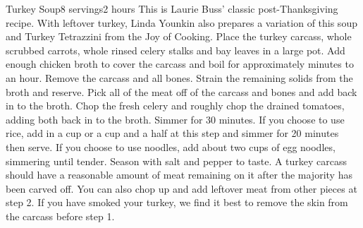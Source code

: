 \begin{recipe}{Turkey Soup}{8 servings}{2 hours}
\freeform This  is Laurie Buss' classic post-Thanksgiving recipe. With leftover turkey, Linda Younkin also prepares a variation of this soup and Turkey Tetrazzini from the Joy of Cooking.
Place the turkey carcass, whole scrubbed carrots, whole rinsed celery stalks and bay leaves in a large pot. Add enough chicken broth to cover the carcass and boil for approximately \unit[45]{minutes} to an hour.
\newstep Remove the carcass and all bones. Strain the remaining solids from the broth and reserve. Pick all of the meat off of the carcass and bones and add back in to the broth.
Chop the fresh celery and roughly chop the drained tomatoes, adding both back in to the broth. Simmer for 30 minutes.
If you choose to use rice, add in a cup or a cup and a half at this step and simmer for 20 minutes then serve. If you choose to use noodles, add about two cups of egg noodles, simmering until tender. Season with salt and pepper to taste.
\freeform A turkey carcass should have a reasonable amount of meat remaining on it after the majority has been carved off. You can also chop up and add leftover meat from other pieces at step 2. If you have smoked your turkey, we find it best to remove the skin from the carcass before step 1.
\end{recipe}

